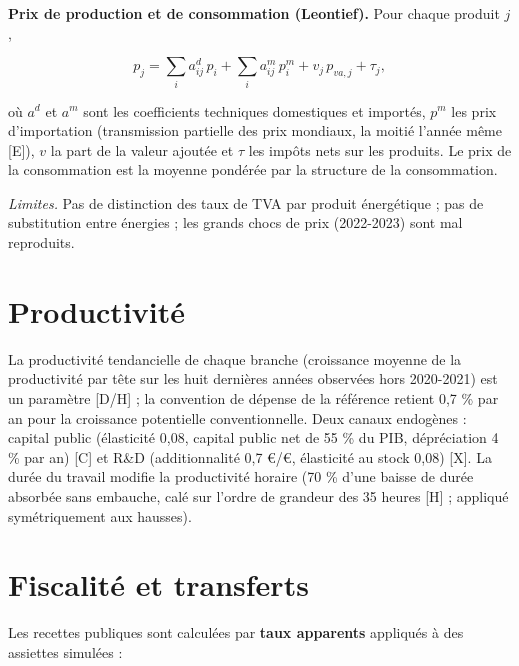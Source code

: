 \documentclass[
  11pt,
  11pt,
  a4paper,
  openany]{book}
\begin{document}
\textbf{Prix de production et de consommation (Leontief).} Pour chaque
produit \(j\),

\[p_j = \sum_i a_{ij}^d\,p_i + \sum_i a_{ij}^m\,p^m_i + v_j\,p_{va,j} + \tau_j,\]

où \(a^d\) et \(a^m\) sont les coefficients techniques domestiques et
importés, \(p^m\) les prix d'importation (transmission partielle des
prix mondiaux, la moitié l'année même {[}E{]}), \(v\) la part de la
valeur ajoutée et \(\tau\) les impôts nets sur les produits. Le prix de
la consommation est la moyenne pondérée par la structure de la
consommation.

\emph{Limites.} Pas de distinction des taux de TVA par produit
énergétique ; pas de substitution entre énergies ; les grands chocs de
prix (2022-2023) sont mal reproduits.

\hypertarget{sec:eq-productivite}{%
\section{Productivité}\label{sec:eq-productivite}}

La productivité tendancielle de chaque branche (croissance moyenne de la
productivité par tête sur les huit dernières années observées hors
2020-2021) est un paramètre {[}D/H{]} ; la convention de dépense de la
référence retient 0,7 \% par an pour la croissance potentielle
conventionnelle. Deux canaux endogènes : capital public (élasticité
0,08, capital public net de 55 \% du PIB, dépréciation 4 \% par an)
{[}C{]} et R\&D (additionnalité 0,7 €/€, élasticité au stock 0,08)
{[}X{]}. La durée du travail modifie la productivité horaire (70 \%
d'une baisse de durée absorbée sans embauche, calé sur l'ordre de
grandeur des 35 heures {[}H{]} ; appliqué symétriquement aux hausses).

\hypertarget{sec:eq-fiscalite}{%
\section{Fiscalité et transferts}\label{sec:eq-fiscalite}}

Les recettes publiques sont calculées par \textbf{taux apparents}
appliqués à des assiettes simulées :
\end{document}
